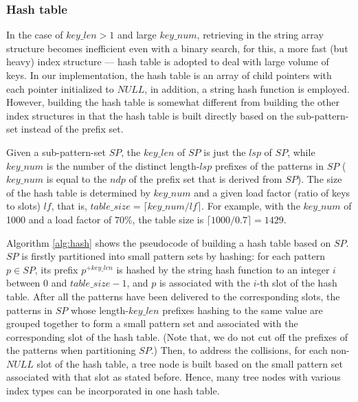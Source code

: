 \documentclass[legalpaper]{article}
\begin{document}
\subsubsection{Hash table}
\label{sec:hash table}

In the case of $key\_len > 1$ and large $key\_num$, retrieving in the
string array structure becomes inefficient even with a binary search,
for this, a more fast (but heavy) index structure --- \textsf{hash
table} is adopted to deal with large volume of keys. In our
implementation, the hash table is an array of child pointers with each
pointer initialized to $NULL$, in addition, a \textsf{string hash
function} is employed. However, building the hash table is somewhat
different from building the other index structures in that the hash
table is built directly based on the sub-pattern-set instead of the
prefix set.


Given a sub-pattern-set $SP$, the $key\_len$ of $SP$ is just the $lsp$
of $SP$, while $key\_num$ is the number of the distinct length-$lsp$
prefixes of the patterns in $SP$ ( $key\_num$ is equal to the $ndp$ of
the prefix set that is derived from $SP$).  The size of the hash table
is determined by $key\_num$ and a given \textsf{load factor} (ratio of
keys to slots) $lf$, that is, $table\_size = \lceil key\_num/lf
\rceil$. For example, with the $key\_num$ of 1000 and a load factor of
$70\%$, the table size is $\lceil 1000/0.7 \rceil = 1429$.

Algorithm \ref{alg:hash} shows the pseudocode of building a hash table
based on $SP$. $SP$ is firstly partitioned into small pattern sets by
hashing: for each pattern $p \in SP$, its prefix $p^{+key\_len}$ is
hashed by the string hash function to an integer $i$ between 0 and
$table\_size-1$, and $p$ is associated with the $i$-th slot of the
hash table. After all the patterns have been delivered to the
corresponding slots, the patterns in $SP$ whose length-$key\_len$
prefixes hashing to the same value are grouped together to form a
small pattern set and associated with the corresponding slot of the
hash table. (Note that, we do not cut off the prefixes of the patterns
when partitioning $SP$.) Then, to address the collisions, for each
non-$NULL$ slot of the hash table, a tree node is built based on the
small pattern set associated with that slot as stated before. Hence,
many tree nodes with various index types can be incorporated in one
hash table.
\end{document}

